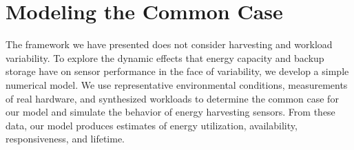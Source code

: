 

\section{Modeling the Common Case}
\label{sec:overview}
The framework we have presented does not consider
harvesting and workload
variability.
To explore the dynamic effects that energy
capacity and backup storage have on sensor performance in the face
of variability, we develop a simple numerical model.
We use representative environmental conditions, measurements of real hardware,
and synthesized workloads to determine the common case for our model and simulate
the behavior of energy harvesting sensors. From these data, our model
produces estimates of energy utilization, availability, responsiveness, and
lifetime.
\\

